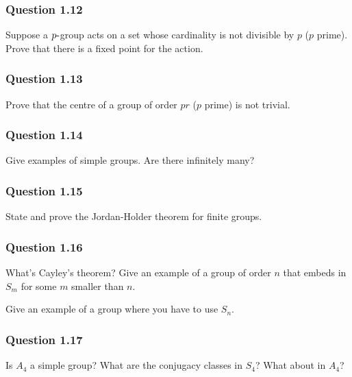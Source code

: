 \hypertarget{question-1.12}{%
\subsubsection{Question 1.12}\label{question-1.12}}

Suppose a \(p{\hbox{-}}\)group acts on a set whose cardinality is not
divisible by \(p\) (\(p\) prime). Prove that there is a fixed point for
the action.

\hypertarget{question-1.13}{%
\subsubsection{Question 1.13}\label{question-1.13}}

Prove that the centre of a group of order \(pr\) (\(p\) prime) is not
trivial.

\hypertarget{question-1.14}{%
\subsubsection{Question 1.14}\label{question-1.14}}

Give examples of simple groups. Are there infinitely many?

\hypertarget{question-1.15}{%
\subsubsection{Question 1.15}\label{question-1.15}}

State and prove the Jordan-Holder theorem for finite groups.

\hypertarget{question-1.16}{%
\subsubsection{Question 1.16}\label{question-1.16}}

What's Cayley's theorem? Give an example of a group of order \(n\) that
embeds in \(S_m\) for some \(m\) smaller than \(n\).

Give an example of a group where you have to use \(S_n\).

\hypertarget{question-1.17}{%
\subsubsection{Question 1.17}\label{question-1.17}}

Is \(A_4\) a simple group? What are the conjugacy classes in \(S_4\)?
What about in \(A_4\)?

